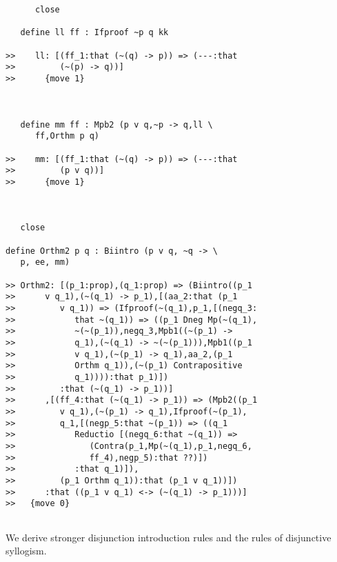 \documentclass[12pt]{article}
\begin{document}
\begin{verbatim}
      close

   define ll ff : Ifproof ~p q kk

>>    ll: [(ff_1:that (~(q) -> p)) => (---:that
>>         (~(p) -> q))]
>>      {move 1}



   define mm ff : Mpb2 (p v q,~p -> q,ll \
      ff,Orthm p q)

>>    mm: [(ff_1:that (~(q) -> p)) => (---:that
>>         (p v q))]
>>      {move 1}



   close

define Orthm2 p q : Biintro (p v q, ~q -> \
   p, ee, mm)

>> Orthm2: [(p_1:prop),(q_1:prop) => (Biintro((p_1
>>      v q_1),(~(q_1) -> p_1),[(aa_2:that (p_1
>>         v q_1)) => (Ifproof(~(q_1),p_1,[(negq_3:
>>            that ~(q_1)) => ((p_1 Dneg Mp(~(q_1),
>>            ~(~(p_1)),negq_3,Mpb1((~(p_1) ->
>>            q_1),(~(q_1) -> ~(~(p_1))),Mpb1((p_1
>>            v q_1),(~(p_1) -> q_1),aa_2,(p_1
>>            Orthm q_1)),(~(p_1) Contrapositive
>>            q_1)))):that p_1)])
>>         :that (~(q_1) -> p_1))]
>>      ,[(ff_4:that (~(q_1) -> p_1)) => (Mpb2((p_1
>>         v q_1),(~(p_1) -> q_1),Ifproof(~(p_1),
>>         q_1,[(negp_5:that ~(p_1)) => ((q_1
>>            Reductio [(negq_6:that ~(q_1)) =>
>>               (Contra(p_1,Mp(~(q_1),p_1,negq_6,
>>               ff_4),negp_5):that ??)])
>>            :that q_1)]),
>>         (p_1 Orthm q_1)):that (p_1 v q_1))])
>>      :that ((p_1 v q_1) <-> (~(q_1) -> p_1)))]
>>   {move 0}


\end{verbatim}

We derive stronger disjunction introduction rules and the rules of disjunctive syllogism.
\end{document}
